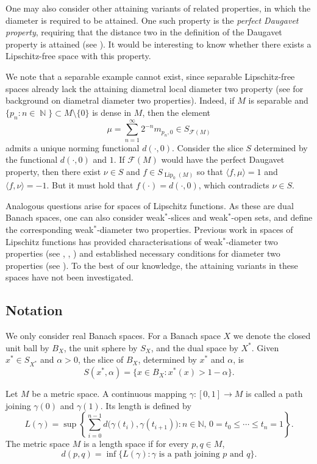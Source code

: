 \documentclass[a4paper,12pt]{amsart}
\theoremstyle{plain}
\theoremstyle{definition}
\theoremstyle{remark}
\numberwithin{equation}{section}
\DeclareMathOperator{\Lip}{Lip}
\DeclareMathOperator{\N}{\mathbb{N}}
\begin{document}
One may also consider other attaining variants of related properties, in which the diameter is required to be attained. One such property is the \emph{perfect Daugavet property}, requiring that the distance two in the definition of the Daugavet property is attained (see \cite[page 212]{10481/104200}). It would be interesting to know whether there exists a Lipschitz-free space with this property. 

We note that a separable example cannot exist, since separable Lipschitz-free spaces already lack the attaining diametral local diameter two property (see \cite{MR3818544} for background on diametral diameter two properties). Indeed, if $M$ is separable and $\{p_n:n\in \N\}\subset M\setminus \{0\}$ is dense in $M$, then the element 
\[\mu=\sum_{n=1}^\infty 2^{-n}m_{p_n,0}\in S_{\mathcal{F}(M)}\]
admits a unique norming functional $d(\cdot,0)$. Consider the slice $S$ determined by the functional $d(\cdot,0)$ and $1$. If $\mathcal{F}(M)$ would have the perfect Daugavet property, then there exist $\nu\in S$ and $f\in S_{\Lip_0(M)}$ so that $\langle f,\mu \rangle=1$ and $\langle f,\nu \rangle=-1$. But it must hold that $f(\cdot)=d(\cdot,0)$, which contradicts $\nu\in S$.


 
Analogous questions arise for spaces of Lipschitz functions. As these are dual Banach spaces, one can also consider weak$^*$-slices and weak$^*$-open sets, and define the corresponding weak$^*$-diameter two properties.  Previous work in spaces of Lipschitz functions has provided characterisations of weak$^*$-diameter two properties  (see \cite{HALLER2026130178}, \cite{MR4026495}, \cite{MR3803112}) and established necessary conditions for diameter two properties (see \cite{MR4849357}). To the best of our knowledge, the attaining variants in these spaces have not been investigated.

\subsection*{Notation}  We only consider real Banach spaces. For a Banach space $X$ we denote the closed unit ball by $B_X$, the unit sphere by $S_X$, and the dual space by $X^*$. Given $x^*\in S_{X^*}$ and $\alpha>0$, the slice of $B_X$, determined by $x^*$ and $\alpha$, is 
\[
S(x^*,\alpha)=\{x\in B_X: x^*(x)>1-\alpha\}.
\]



Let $M$ be a metric space. A continuous mapping $\gamma\colon[0,1]\rightarrow M$ is called a path joining $\gamma(0)$ and $\gamma(1)$. Its length is defined by
\[
L(\gamma) = \sup\left\{\sum_{i=0}^{n-1} d\big(\gamma(t_i), \gamma(t_{i+1})\big) \colon n\in \mathbb{N},\, 0=t_0\leq \dotsb\leq t_n=1\right\}.
\]
The metric space $M$ is a length space if for every $p,q\in M$, 
\[
d(p,q)=\inf\{L(\gamma):\gamma \text{ is a path joining } p \text{ and }q\}.\]
\end{document}
